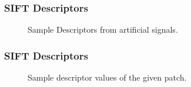 \documentclass[aspectratio=169]{beamer}
\begin{document}
    
    \begin{frame}
        \frametitle{SIFT Descriptors}
        \begin{center}
   			\begin{figure}[thpb]
      		\centering
      		\setlength\fboxsep{0pt}
	  		\setlength\fboxrule{0.5pt}
      		\caption{\centering Sample Descriptors from artificial signals.}
      		\label{figure1}
   			\end{figure}        
        \end{center}
    \end{frame}       
        
    \begin{frame}
        \frametitle{SIFT Descriptors}
        \begin{center}
   			\begin{figure}[thpb]
      		\centering
      		\setlength\fboxsep{0pt}
	  		\setlength\fboxrule{0.5pt}
      		\caption{\centering Sample descriptor values of the given patch.}
      		\label{figure1}
   			\end{figure}        
        \end{center}
    \end{frame}   
    
\end{document}
